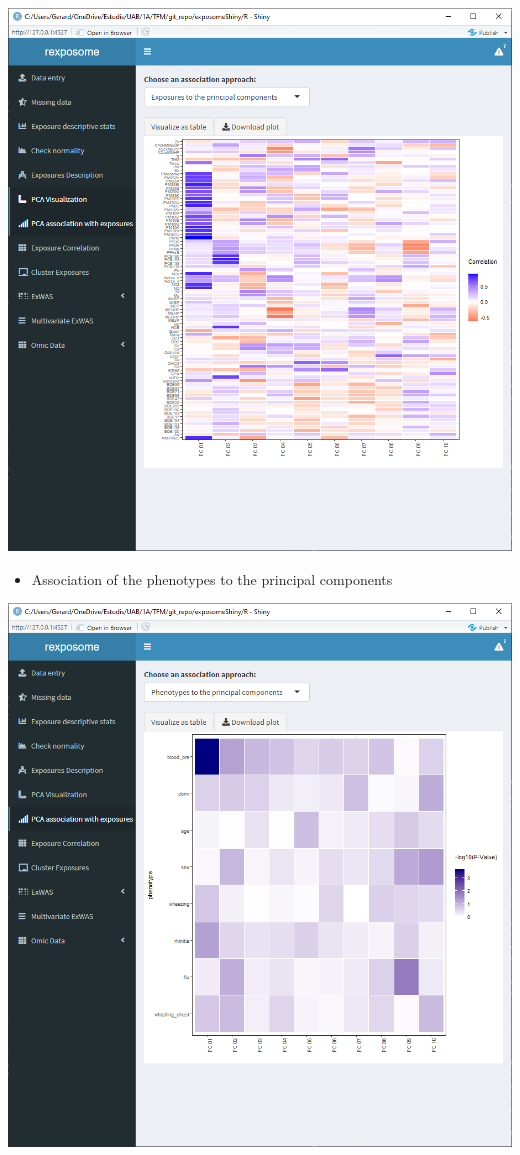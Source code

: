 \documentclass[
]{book}
\providecommand{\tightlist}{%
  \setlength{\itemsep}{0pt}\setlength{\parskip}{0pt}}
\begin{document}
\includegraphics{images/analysis5_3.png}

\begin{itemize}
\tightlist
\item
  Association of the phenotypes to the principal components
\end{itemize}

\includegraphics{images/analysis5_3_1.png}
\end{document}
